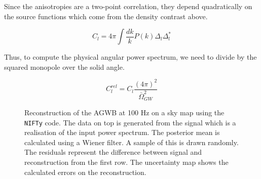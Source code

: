 Since the anisotropies are a two-point correlation, they depend quadratically on the source functions which come from the density contrast above.

\begin{equation}
    C_l = 4\pi \int \frac{dk}{k} P(k) \Delta_l \Delta_l^*
\end{equation}

Thus, to compute the physical angular power spectrum, we need to divide by the squared monopole over the solid angle.

\begin{equation}
    C_l^{rel}=C_l \frac{(4\pi)^2}{\bar{\Omega}_{GW}^2}
\end{equation}
\begin{figure}[h]
    \centering
    \newline
    \vspace{-1.5cm}
    \caption[Reconstruction of the AGWB at 100 Hz on a sky map using the {\tt NIFTy} code.]{Reconstruction of the AGWB at 100 Hz on a sky map using the {\tt NIFTy} code. The data on top is generated from the signal which is a realisation of the input power spectrum. The posterior mean is calculated using a Wiener filter. A sample of this is drawn randomly. The residuals represent the difference between signal and reconstruction from the first row. The uncertainty map shows the calculated errors on the reconstruction.}
    \label{sky_maps_100}
\end{figure}

